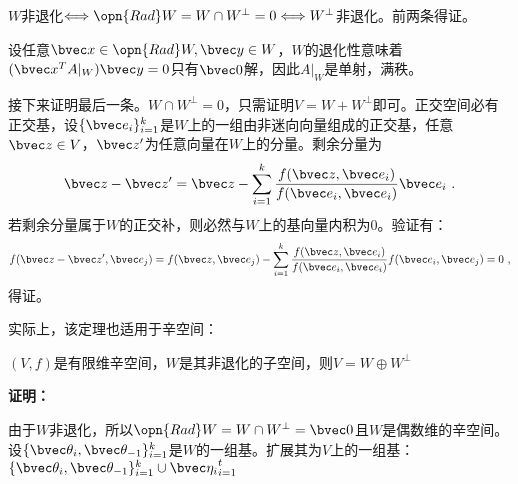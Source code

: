 $W$非退化$\Longleftrightarrow \opn{Rad}W=W\cap W^{\bot}=0\Longleftrightarrow  W^{\bot}$非退化。前两条得证。

设任意$\bvec x\in \opn{Rad} W,\bvec y\in W$，$W$的退化性意味着$(\bvec x^{T}A|_{W})\bvec  y=0$只有$\bvec 0$解，因此$A|_{W}$是单射，满秩。

接下来证明最后一条。$W\cap W^{\bot}=0$，只需证明$V=W+W^{\bot}$即可。正交空间必有正交基，设$\{\bvec e_i\}_{i=1}^k$是$W$上的一组由非迷向向量组成的正交基，任意$\bvec z\in V$，$\bvec z'$为任意向量在$W$上的分量。剩余分量为
\begin{equation}
\bvec z-\bvec z'=\bvec z-\sum\limits_{i=1}^k\frac{f(\bvec z,\bvec e_i)}{f(\bvec e_i,\bvec e_i)}\bvec e_i~.
\end{equation}
若剩余分量属于$W$的正交补，则必然与$W$上的基向量内积为$0$。验证有：
\begin{equation}
f(\bvec z-\bvec z',\bvec e_j)=f(\bvec z,\bvec e_j)-\sum\limits_{i=1}^k\frac{f(\bvec z,\bvec e_i)}{f(\bvec e_i,\bvec e_i)}f(\bvec e_i,\bvec e_j)=0~,
\end{equation}
得证。

实际上，该定理也适用于辛空间：
\begin{theorem}{}
$(V,f)$是有限维辛空间，$W$是其非退化的子空间，则$V=W\oplus W^{\bot}$
\end{theorem}
\textbf{证明：}

由于$W$非退化，所以$\opn{Rad} W=W\cap W^{\bot}={\bvec 0}$且$W$是偶数维的辛空间。设$\{\bvec \theta_i,\bvec \theta_{-1}\}_{i=1}^k$是$W$的一组基。扩展其为$V$上的一组基：$\{\bvec \theta_i,\bvec \theta_{-1}\}_{i=1}^k\cup{\bvec \eta_i}_{i=1}^{t}$
